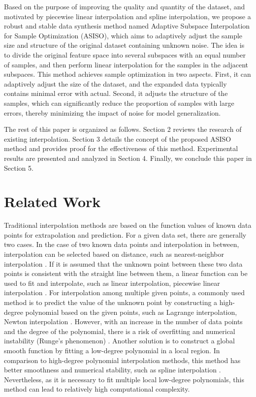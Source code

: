 \documentclass[sn-mathphys,Numbered]{sn-jnl}%
\theoremstyle{thmstyleone}%
\theoremstyle{thmstyletwo}%
\theoremstyle{thmstylethree}%
\begin{document}
Based on the purpose of improving the quality and quantity of the dataset, and motivated by piecewise linear interpolation and spline interpolation, we propose a robust and stable data synthesis method named Adaptive Subspace Interpolation for Sample Optimization (ASISO), which aims to adaptively adjust the sample size and structure of the original dataset containing unknown noise. The idea is to divide the original feature space into several subspaces with an equal number of samples, and then perform linear interpolation for the samples in the adjacent subspaces. This method achieves sample optimization in two aspects. First, it can adaptively adjust the size of the dataset, and the expanded data typically contains minimal error with actual. Second, it adjusts the structure of the samples, which can significantly reduce the proportion of samples with large errors, thereby minimizing the impact of noise for model generalization.

The rest of this paper is organized as follows. Section 2 reviews the research of existing interpolation. Section 3 details the concept of the proposed ASISO method and provides proof for the effectiveness of this method. Experimental results are presented and analyzed in Section 4. Finally, we conclude this paper in Section 5.

\section{Related Work}\label{sec2}

Traditional interpolation methods are based on the function values of known data points for extrapolation and prediction. For a given data set, there are generally two cases. In the case of two known data points and interpolation in between, interpolation can be selected based on distance, such as nearest-neighbor interpolation \cite{bib14}. If it is assumed that the unknown point between these two data points is consistent with the straight line between them, a linear function can be used to fit and interpolate, such as linear interpolation, piecewise linear interpolation \cite{bib15,bib16}. For interpolation among multiple given points, a commonly used method is to predict the value of the unknown point by constructing a high-degree polynomial based on the given points, such as Lagrange interpolation, Newton interpolation \cite{bib17,bib18}. However, with an increase in the number of data points and the degree of the polynomial, there is a risk of overfitting and numerical instability (Runge's phenomenon) \cite{bib19}. Another solution is to construct a global smooth function by fitting a low-degree polynomial in a local region. In comparison to high-degree polynomial interpolation methods, this method has better smoothness and numerical stability, such as spline interpolation \cite{bib20}. Nevertheless, as it is necessary to fit multiple local low-degree polynomials, this method can lead to relatively high computational complexity.
\end{document}
